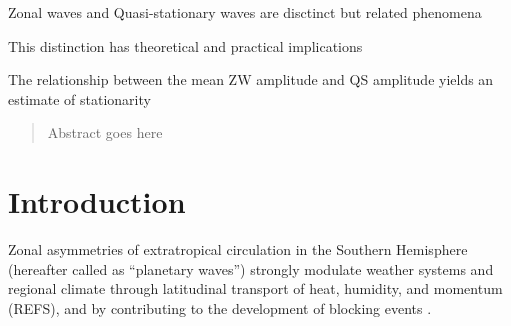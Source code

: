 \documentclass[draft,linenumbers]{agujournal2018}
\begin{document}



\begin{keypoints}
\item Zonal waves and Quasi-stationary waves are disctinct but related
phenomena
\item This distinction has theoretical and practical implications
\item The relationship between the mean ZW amplitude and QS amplitude yields
an estimate of stationarity
\end{keypoints}

%
%


\begin{abstract}
Abstract goes here
\end{abstract}

\section{Introduction}

Zonal asymmetries of extratropical circulation in the Southern
Hemisphere (hereafter called as ``planetary waves'') strongly modulate
weather systems and regional climate through latitudinal transport of
heat, humidity, and momentum (REFS), and by contributing to the
development of blocking events \citep[e.g.][]{Trenberth1985}.
\end{document}
